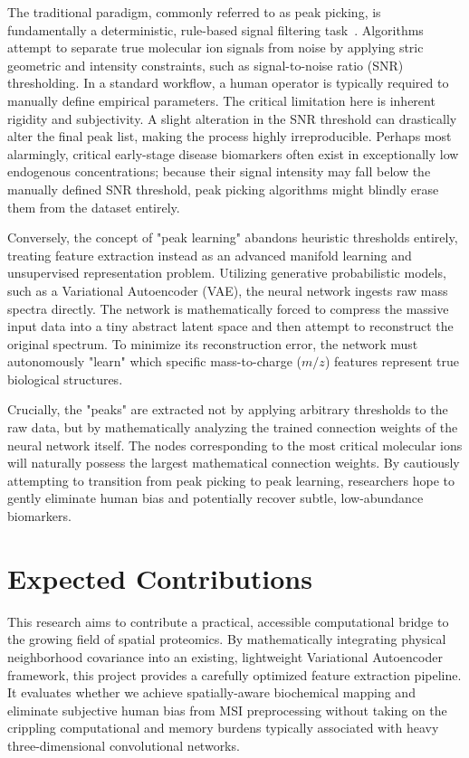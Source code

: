 \documentclass[
12pt, %
oneside, %
english, %
onehalfspacing, %
nolistspacing, %
headsepline, %
]{MastersDoctoralThesis} %
\begin{document}
The traditional paradigm, commonly referred to as peak picking, is fundamentally a deterministic, rule-based signal filtering task~\citep{li2022machinelearningpeakpicking}. Algorithms attempt to separate true molecular ion signals from noise by applying stric geometric and intensity constraints, such as signal-to-noise ratio (SNR) thresholding. In a standard workflow, a human operator is typically required to manually define empirical parameters. The critical limitation here is inherent rigidity and subjectivity. A slight alteration in the SNR threshold can drastically alter the final peak list, making the process highly irreproducible. Perhaps most alarmingly, critical early-stage disease biomarkers often exist in exceptionally low endogenous concentrations; because their signal intensity may fall below the manually defined SNR threshold, peak picking algorithms might blindly erase them from the dataset entirely.\citep{abdelmoula2021peak}

Conversely, the concept of "peak learning" abandons heuristic thresholds entirely, treating feature extraction instead as an advanced manifold learning and unsupervised representation problem. Utilizing generative probabilistic models, such as a Variational Autoencoder (VAE), the neural network ingests raw mass spectra directly. The network is mathematically forced to compress the massive input data into a tiny abstract latent space and then attempt to reconstruct the original spectrum. To minimize its reconstruction error, the network must autonomously "learn" which specific mass-to-charge ($m/z$) features represent true biological structures.

Crucially, the "peaks" are extracted not by applying arbitrary thresholds to the raw data, but by mathematically analyzing the trained connection weights of the neural network itself. The nodes corresponding to the most critical molecular ions will naturally possess the largest mathematical connection weights. By cautiously attempting to transition from peak picking to peak learning, researchers hope to gently eliminate human bias and potentially recover subtle, low-abundance biomarkers.

\section{Expected Contributions}

This research aims to contribute a practical, accessible computational bridge to the growing field of spatial proteomics. By mathematically integrating physical neighborhood covariance into an existing, lightweight Variational Autoencoder framework, this project provides a carefully optimized feature extraction pipeline. It evaluates whether we achieve spatially-aware biochemical mapping and eliminate subjective human bias from MSI preprocessing without taking on the crippling computational and memory burdens typically associated with heavy three-dimensional convolutional networks.
\end{document}
